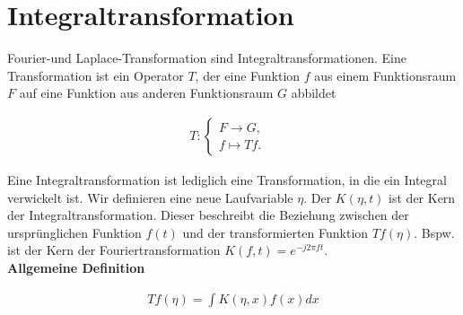 \documentclass[10pt,a4paper]{article}
\begin{document}
  \section{Integraltransformation}
  Fourier-und Laplace-Transformation sind Integraltransformationen. 
  Eine Transformation ist ein Operator $T$, der eine Funktion $f$ aus einem Funktionsraum $F$ 
  auf eine Funktion aus anderen Funktionsraum $G$ abbildet
  \begin{mdframed}[style=exercise]
    \begin{align}
        T:\left\{\begin{array}{ll} F \rightarrow G, \\
         f	\mapsto Tf. & \end{array}\right. 
    \end{align}
  \end{mdframed}
  Eine Integraltransformation ist lediglich eine Transformation, in die ein Integral verwickelt ist.
  Wir definieren eine neue Laufvariable $\eta$. Der $K(\eta,t)$ ist der Kern der Integraltransformation. 
  Dieser beschreibt die Beziehung zwischen der ursprünglichen Funktion $f(t)$ und der transformierten Funktion $Tf(\eta)$.
  Bspw. ist der Kern der Fouriertransformation $K(f,t) = e^{-j2\pi ft}$. \\
  \textbf{Allgemeine Definition}
  \begin{mdframed}[style=exercise]
    \begin{align}
        Tf(\eta) = \displaystyle\int K(\eta,x) f(x) dx
    \end{align}
  \end{mdframed}
  
\end{document}
